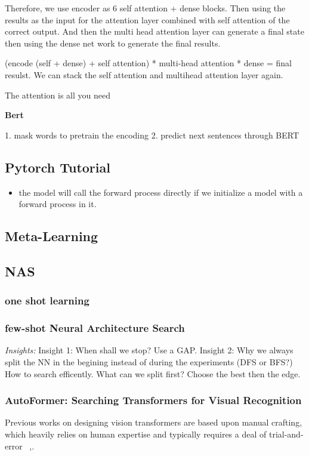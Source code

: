 \documentclass[UTF8]{article}
\begin{document}
Therefore, we use encoder as 6 self attention + dense blocks. Then using the results as the input for the attention layer combined with self attention of the correct output. And then the multi head attention layer can generate a final state then using the dense net work to generate the final results.

(encode (self + dense) + self attention) * multi-head attention * dense = final resulst. We can stack the self attention and multihead attention layer again.

The attention is all you need~\cite{vaswani2017attention}

\textbf{Bert}

1. mask words to pretrain the encoding
2. predict next sentences through BERT

\subsection{Pytorch Tutorial}
\begin{itemize}
    \item the model will call the forward process directly if we initialize a model with a forward process in it.
\end{itemize}

\subsection{Meta-Learning}
\subsection{NAS}
\subsubsection{one shot learning}
\subsubsection{few-shot Neural Architecture Search}
\emph{Insights:}
Insight 1: When shall we stop? Use a GAP.
Insight 2: Why we always split the NN in the begining instead of during the experiments (DFS or BFS?) How to search efficently.
What can we split first? Choose the best then the edge.

\subsubsection{AutoFormer: Searching Transformers for Visual Recognition}
Previous works on designing vision transformers are based upon manual crafting, which heavily relies on human expertise and typically requires a deal of trial-and- error ~\cite{yuan2021tokens, touvron2021training, dosovitskiy2020image},.
\end{document}
